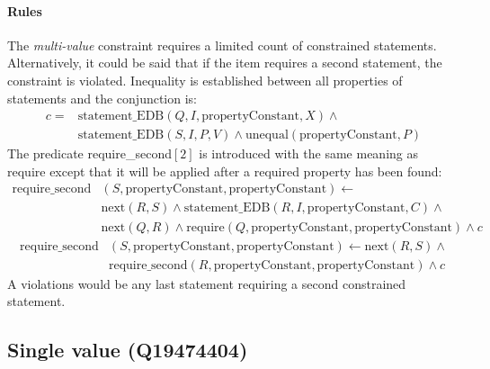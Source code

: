 \documentclass[hyperref,bachelorofscience,fleqn]{cgvpub}
\begin{document}
\paragraph{Rules}
The \emph{multi-value} constraint requires a limited count of constrained statements. Alternatively, it could be said that if the item requires a second statement, the constraint is violated. Inequality is established between all properties of statements and the conjunction is:
\begin{equation*}
\begin{split}
c = &\text{statement\_EDB}(Q, I, \text{propertyConstant}, X) \wedge{} \\
&\text{statement\_EDB}(S, I, P, V) \wedge \text{unequal}(\text{propertyConstant}, P)
\end{split}
\end{equation*}
The predicate require\_second\([2]\) is introduced with the same meaning as require except that it will be applied after a required property has been found:
\begin{equation*}
\begin{split}
\text{require\_second}&(S, \text{propertyConstant}, \text{propertyConstant}) \leftarrow \\
&\text{next}(R, S) \wedge \text{statement\_EDB}(R, I, \text{propertyConstant}, C) \wedge{} \\
&\text{next}(Q, R) \wedge \text{require}(Q, \text{propertyConstant}, \text{propertyConstant})  \wedge c
\end{split}
\end{equation*}
\begin{equation*}
\begin{split}
\text{require\_second}&(S, \text{propertyConstant}, \text{propertyConstant}) \leftarrow \text{next}(R, S) \wedge{} \\
&\text{require\_second}(R, \text{propertyConstant}, \text{propertyConstant}) \wedge c
\end{split}
\end{equation*}
A violations would be any last statement requiring a second constrained statement.\\

\subsection{Single value (Q19474404)}
\end{document}
